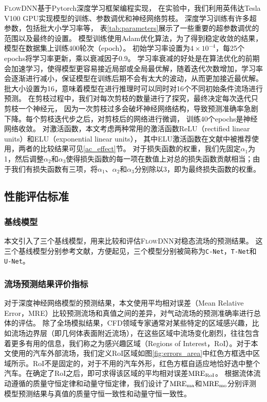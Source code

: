 \textsc{FlowDNN}基于Pytorch深度学习框架编程实现，
在实验中，我们利用英伟达Tesla V100 GPU实现模型的训练、参数调优和神经网络剪枝。
深度学习训练有许多超参数，包括批大小学习率等，
表\ref{tab:parameters}展示了一些重要的超参数调优的范围以及最终的设置。
模型训练使用Adam优化算法，为了得到稳定收敛的结果，模型在数据集上训练400轮次（epoch）。
初始学习率设置为$4\times10^{-4}$，每25个epochs将学习率更新，乘以衰减因子0.9。
学习率衰减的好处是在算法优化的前期会加速学习，使得模型更容易接近局部或全局最优解，随着迭代次数增加，学习率会逐渐进行减小，保证模型在训练后期不会有太大的波动，从而更加接近最优解。
批大小设置为16，意味着模型在进行推理时可以同时对16个不同初始条件流场进行预测。
在剪枝过程中，我们对每次剪枝的数量进行了探究，最终决定每次迭代只剪枝一个神经元，
因为一次剪枝过多会破坏神经网络结构，导致预测准确率急剧下降。每个剪枝迭代步之后，对剪枝后的网络进行微调，
训练40个epochs是神经网络收敛。
对激活函数，本文考虑两种常用的激活函数ReLU（rectified linear units）和ELU（exponential linear units），
其中ELU激活函数在文献\cite{DBLP:journals/corr/abs-1908-04387}中被推荐使用，两者的比较结果可见\ref{ac_effect}节。
对于损失函数的权重，我们先固定${\alpha _1}$为1，然后调整${\alpha _2}$和${\alpha _3}$使得损失函数的每一项在数值上对总的损失函数贡献相当；由于我们有损失函数有三项，将${\alpha _1}$、${\alpha _2}$和${\alpha _3}$分别除以3，即为最终损失函数的权重。




\subsection{性能评估标准}

\subsubsection{基线模型}
本文引入了三个基线模型，用来比较和评估\textsc{FlowDNN}对稳态流场的预测结果。
这三个基线模型分别参考文献\cite{DBLP:conf/kdd/GuoLI16,thuerey2019deep,DBLP:conf/miccai/RonnebergerFB15}，方便起见，三个模型分别被简称为\texttt{C-Net}，\texttt{T-Net}和\texttt{U-Net}。


\subsubsection{流场预测结果评价指标}
对于深度神经网络模型的预测结果，本文使用平均相对误差（Mean Relative Error，MRE）比较预测流场和真值之间的差异，对气动流场的预测准确率进行总体的评估。
除了全场模拟结果，CFD领域专家通常对某些特定的区域感兴趣，比如流场边界层（即几何体表面附近流场），在这些区域中流场变化剧烈，往往包含着更多有用的信息，我们称之为感兴趣区域（Regions of Interest，RoI）。对于本文使用的汽车外部流场，我们定义RoI区域如图\ref{fig:errors_area}中红色方框选中区域所示。RoI不是固定的，对于不用的汽车外形，红色方框自适应地恰好选中整个汽车。在确定了RoI之后，即可求得该区域的平均相对误差$\rm{MRE_{RoI}}$。
根据流体流动遵循的质量守恒定律和动量守恒定律，我们设计了${\rm{MRE}_{ma}}$和${\rm{MRE}_{mo}}$分别评测模型预测结果与真值的质量守恒一致性和动量守恒一致性。

